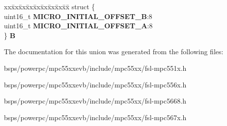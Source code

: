 \begin{DoxyCompactItemize}
\begin{tabbing}
\end{tabbing}\item 
\mbox{\label{unionuPCR20_a98bfd3a6211b52de159f570487ac81b5}} 
\begin{tabbing}
xx\=xx\=xx\=xx\=xx\=xx\=xx\=xx\=xx\=\kill
struct \{\\
\>uint16\_t {\bfseries MICRO\_INITIAL\_OFFSET\_B}:8\\
\>uint16\_t {\bfseries MICRO\_INITIAL\_OFFSET\_A}:8\\
\} {\bfseries B}\\

\end{tabbing}\end{DoxyCompactItemize}


The documentation for this union was generated from the following files\+:\begin{DoxyCompactItemize}
\item 
bsps/powerpc/mpc55xxevb/include/mpc55xx/fsl-\/mpc551x.\+h\item 
bsps/powerpc/mpc55xxevb/include/mpc55xx/fsl-\/mpc556x.\+h\item 
bsps/powerpc/mpc55xxevb/include/mpc55xx/fsl-\/mpc5668.\+h\item 
bsps/powerpc/mpc55xxevb/include/mpc55xx/fsl-\/mpc567x.\+h\end{DoxyCompactItemize}
